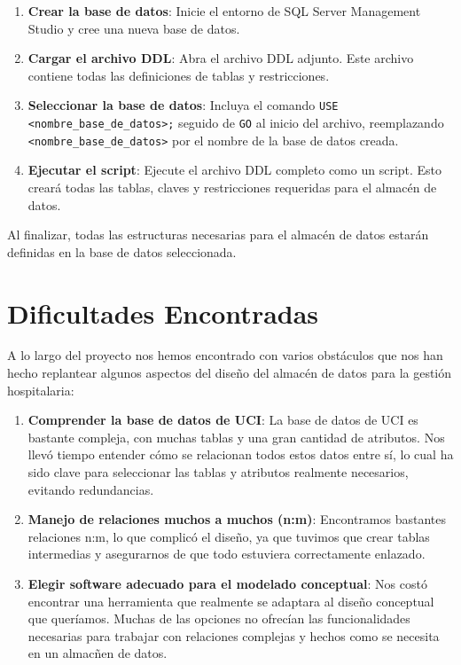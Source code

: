 \documentclass{article}
\begin{document}
\begin{enumerate}
	\item \textbf{Crear la base de datos}: Inicie el entorno de SQL Server Management Studio y cree una nueva base de datos.
	\item \textbf{Cargar el archivo DDL}: Abra el archivo DDL adjunto. Este archivo contiene todas las definiciones de tablas y restricciones.
	\item \textbf{Seleccionar la base de datos}: Incluya el comando \texttt{USE <nombre\_base\_de\_datos>;} seguido de \texttt{GO} al inicio del archivo, reemplazando \texttt{<nombre\_base\_de\_datos>} por el nombre de la base de datos creada.
	\item \textbf{Ejecutar el script}: Ejecute el archivo DDL completo como un script. Esto creará todas las tablas, claves y restricciones requeridas para el almacén de datos.
\end{enumerate}

Al finalizar, todas las estructuras necesarias para el almacén de datos estarán definidas en la base de datos seleccionada.


\section{Dificultades Encontradas}
\label{sec:dificultades_encontradas}

A lo largo del proyecto nos hemos encontrado con varios obstáculos que nos han hecho replantear algunos aspectos del diseño del almacén de datos para la gestión hospitalaria:

\begin{enumerate}
	\item \textbf{Comprender la base de datos de UCI}: La base de datos de UCI es bastante compleja, con muchas tablas y una gran cantidad de atributos. Nos llevó tiempo entender cómo se relacionan todos estos datos entre sí, lo cual ha sido clave para seleccionar las tablas y atributos realmente necesarios, evitando redundancias.
	
	\item \textbf{Manejo de relaciones muchos a muchos (n:m)}: Encontramos bastantes relaciones n:m, lo que complicó el diseño, ya que tuvimos que crear tablas intermedias y asegurarnos de que todo estuviera correctamente enlazado.
	
	\item \textbf{Elegir software adecuado para el modelado conceptual}: Nos costó encontrar una herramienta que realmente se adaptara al diseño conceptual que queríamos. Muchas de las opciones no ofrecían las funcionalidades necesarias para trabajar con relaciones complejas y hechos como se necesita en un almacñen de datos.


\end{enumerate}
\end{document}
